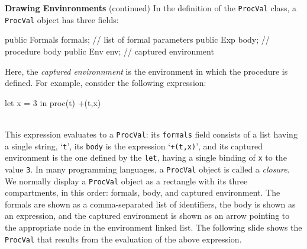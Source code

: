 \begin{minipage}[t]{\sw}
\slidenumber
\LARGE
{\bf Drawing Envinronments} (continued)\exx
In the definition of the \verb'ProcVal' class,
a \verb'ProcVal' object has three fields:
\Large
\begin{qv}
public Formals formals; // list of formal parameters
public Exp body;        // procedure body
public Env env;         // captured environment
\end{qv}
\LARGE
Here, the {\em captured environnment} is the environment
in which the procedure is defined.
For example, consider the following expression:\\[1.5ex]
\Large
\begin{verbbox}
let
  x = 3
in
  proc(t) +(t,x)
\end{verbbox}
\emm\theverbbox\\[1.5ex]
\LARGE
This expression evaluates to a \verb'ProcVal':
its \verb'formals' field consists of a list having a single string, `\verb't'',
its \verb'body' is the expression `\verb'+(t,x)'',
and its captured environment is the one defined by the \verb'let',
having a single binding of \verb'x' to the value \verb'3'.
In many programming languages,
a \verb'ProcVal' object is called a {\em closure}.
We normally display a \verb'ProcVal' object as a rectangle
with its three compartments, in this order:
formals, body, and captured environment.
The formals are shown as a comma-separated list of identifiers,
the body is shown as an expression,
and the captured environment is shown as an arrow
pointing to the appropriate node in the environment linked list.
The following slide shows the \verb'ProcVal' that results
from the evaluation of the above expression.
\end{minipage}
